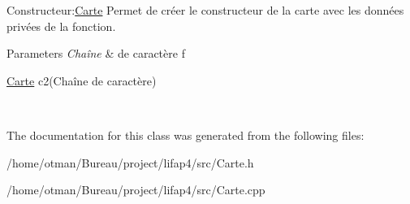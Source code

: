 Constructeur\+:\hyperlink{classCarte}{Carte} Permet de créer le constructeur de la carte avec les données privées de la fonction. 


\begin{DoxyParams}{Parameters}
{\em Chaîne} & de caractère f 
\begin{DoxyCode}
\hyperlink{classCarte}{Carte} c2(Chaîne de caractère)
\end{DoxyCode}
 \\
\hline
\end{DoxyParams}


The documentation for this class was generated from the following files\+:\begin{DoxyCompactItemize}
\item 
/home/otman/\+Bureau/project/lifap4/src/Carte.\+h\item 
/home/otman/\+Bureau/project/lifap4/src/Carte.\+cpp\end{DoxyCompactItemize}
